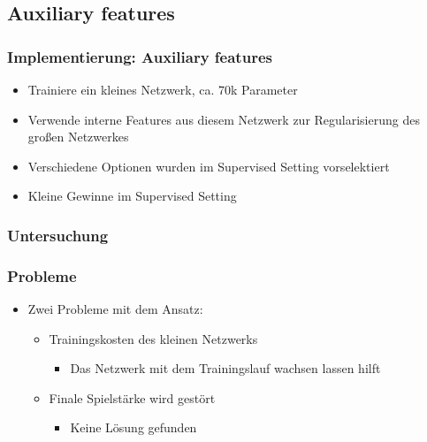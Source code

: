 \subsection{Auxiliary features}



\begin{frame}
 \frametitle{Implementierung: Auxiliary features}
  


\begin{itemize}
  \item \pause Trainiere ein kleines Netzwerk, ca. 70k Parameter
  \item \pause Verwende interne Features aus diesem Netzwerk zur Regularisierung des großen Netzwerkes
  \item \pause Verschiedene Optionen wurden im Supervised Setting vorselektiert
  \item \pause Kleine Gewinne im Supervised Setting
\end{itemize}

  
\end{frame}
\begin{frame}
 \frametitle{Untersuchung}
  


  
\end{frame}
\begin{frame}
 \frametitle{Probleme}
  


\begin{itemize}
  \item \pause Zwei Probleme mit dem Ansatz:
\begin{itemize}
  \item \pause Trainingskosten des kleinen Netzwerks
\begin{itemize}
  \item \pause Das Netzwerk mit dem Trainingslauf wachsen lassen hilft
\end{itemize}
  \item \pause Finale Spielstärke wird gestört
\begin{itemize}
  \item \pause Keine Lösung gefunden
\end{itemize}
\end{itemize}
\end{itemize}


  
\end{frame}

